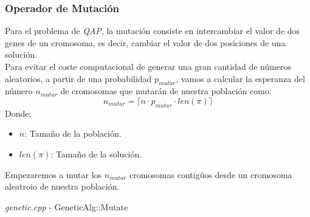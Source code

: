\documentclass[a4paper, 12pt]{article}
\begin{document}
      \newpage
      \subsubsection*{Operador de Mutación}    
      Para el problema de \textit{QAP}, la mutación consiste en intercambiar el valor de dos genes de un cromosoma, es decir, cambiar el valor de dos posiciones de una solución.\\
      
      Para evitar el coste computacional de generar una gran cantidad de números aleatorios, a partir de una probabilidad $p_{mutar}$, vamos a calcular la esperanza del número $n_{mutar}$ de cromosomas que mutarán de nuestra población como:
      $$n_{mutar} = \lceil  n \cdot p_{mutar} \cdot len(\pi) \rceil$$
      Donde:
      \begin{itemize}
      	\item $n$: Tamaño de la población.
      	\item $len(\pi)$: Tamaño de la solución.
      \end{itemize}
      
      Empezaremos a mutar los $n_{mutar}$ cromosomas contigüos desde un cromosoma aleatroio de nuestra población.
      \begin{algorithm}
       	\caption{\textit{genetic.cpp} - GeneticAlg::Mutate}
       	
         \Def{Mutate($P$)}{
         	$P' = P$\\
         	$n_{mutar} = \lceil  n \cdot p_{mutar} \cdot len(P_0) \rceil$\\
         	$i = $ random in $[0, n)$\\
            \For{$j = 1$ \KwTo $n_{mutar}$}{
            	$r1 = $ random in $[0, len(P'_0))$\\
            	$r2 = $ random in $[0, len(P'_0))$\\
            	
            	\If{coste $P_i$ desconocido}{
            		Calcula coste $P_i$\\
            		evaluaciones++\\
            	}
            	
            	$\pi_o = P'_i$\\
            	$t = P'_i(r1)$\\
                $P'_i(r1) = P'_i(r2)$\\
                $P'_i(r2) = t$\\
                
                coste $P'_i(s) =$ coste $\pi_o + \Delta C(\pi_o,r1,r2)$\\
            	
            }         
            
            \textbf{return} $P'$\\
         }
      \end{algorithm}
      
\end{document}
